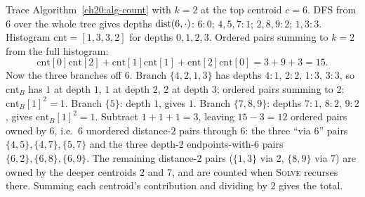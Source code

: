 \begin{labbox}
Trace Algorithm~\ref{ch20:alg-count} with $k=2$ at the top centroid $c=6$. DFS from
$6$ over the whole tree gives depths $\operatorname{dist}(6,\cdot)$: $6\!:\!0$; $4,5,7\!:\!1$;
$2,8,9\!:\!2$; $1,3\!:\!3$. Histogram $\mathrm{cnt}=[1,3,3,2]$ for depths
$0,1,2,3$. Ordered pairs summing to $k=2$ from the full histogram:
\[
  \mathrm{cnt}[0]\mathrm{cnt}[2]+\mathrm{cnt}[1]\mathrm{cnt}[1]+\mathrm{cnt}[2]\mathrm{cnt}[0] = 3+9+3 = 15.
\]
Now the three branches off $6$. Branch $\{4,2,1,3\}$ has depths
$4\!:\!1,\,2\!:\!2,\,1\!:\!3,\,3\!:\!3$, so $\mathrm{cnt}_B$ has $1$ at depth $1$,
$1$ at depth $2$, $2$ at depth $3$; ordered pairs summing to $2$:
$\mathrm{cnt}_B[1]^2=1$. Branch $\{5\}$: depth $1$, gives $1$. Branch $\{7,8,9\}$:
depths $7\!:\!1,\,8\!:\!2,\,9\!:\!2$, gives $\mathrm{cnt}_B[1]^2=1$. Subtract
$1+1+1=3$, leaving $15-3=12$ ordered pairs owned by $6$, i.e.\ $6$ unordered
distance-$2$ pairs through $6$: the three ``via $6$'' pairs $\{4,5\},\{4,7\},\{5,7\}$
and the three depth-$2$ endpoints-with-$6$ pairs $\{6,2\},\{6,8\},\{6,9\}$.
The remaining distance-$2$ pairs ($\{1,3\}$ via $2$, $\{8,9\}$ via $7$) are owned by
the deeper centroids $2$ and $7$, and are counted when \textsc{Solve} recurses
there. Summing each centroid's contribution and dividing by $2$ gives the total.
\end{labbox}


